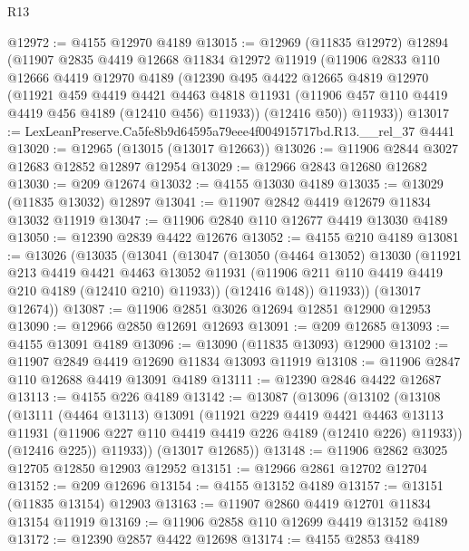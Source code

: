 \begin{lexlean}{R13}
\begin{coremodule}
@12972 := @4155 @12970 @4189
@13015 := @12969
    (@11835 @12972)
    @12894
    (@11907
      @2835
      @4419
      @12668
      @11834
      @12972
      @11919
      (@11906
        @2833
        @110
        @12666
        @4419
        @12970
        @4189
        (@12390
          @495
          @4422
          @12665
          @4819
          @12970
          (@11921
            @459
            @4419
            @4421
            @4463
            @4818
            @11931
            (@11906 @457 @110 @4419 @4419 @456 @4189 (@12410 @456) @11933))
          (@12416 @50))
        @11933))
@13017 := LexLeanPreserve.Ca5fe8b9d64595a79eee4f004915717bd.R13.__rel_37 @4441
@13020 := @12965 (@13015 (@13017 @12663))
@13026 := @11906 @2844 @3027 @12683 @12852 @12897 @12954
@13029 := @12966 @2843 @12680 @12682
@13030 := @209 @12674
@13032 := @4155 @13030 @4189
@13035 := @13029 (@11835 @13032) @12897
@13041 := @11907 @2842 @4419 @12679 @11834 @13032 @11919
@13047 := @11906 @2840 @110 @12677 @4419 @13030 @4189
@13050 := @12390 @2839 @4422 @12676
@13052 := @4155 @210 @4189
@13081 := @13026
    (@13035
      (@13041
        (@13047
          (@13050
            (@4464 @13052)
            @13030
            (@11921
              @213
              @4419
              @4421
              @4463
              @13052
              @11931
              (@11906 @211 @110 @4419 @4419 @210 @4189 (@12410 @210) @11933))
            (@12416 @148))
          @11933))
      (@13017 @12674))
@13087 := @11906 @2851 @3026 @12694 @12851 @12900 @12953
@13090 := @12966 @2850 @12691 @12693
@13091 := @209 @12685
@13093 := @4155 @13091 @4189
@13096 := @13090 (@11835 @13093) @12900
@13102 := @11907 @2849 @4419 @12690 @11834 @13093 @11919
@13108 := @11906 @2847 @110 @12688 @4419 @13091 @4189
@13111 := @12390 @2846 @4422 @12687
@13113 := @4155 @226 @4189
@13142 := @13087
    (@13096
      (@13102
        (@13108
          (@13111
            (@4464 @13113)
            @13091
            (@11921
              @229
              @4419
              @4421
              @4463
              @13113
              @11931
              (@11906 @227 @110 @4419 @4419 @226 @4189 (@12410 @226) @11933))
            (@12416 @225))
          @11933))
      (@13017 @12685))
@13148 := @11906 @2862 @3025 @12705 @12850 @12903 @12952
@13151 := @12966 @2861 @12702 @12704
@13152 := @209 @12696
@13154 := @4155 @13152 @4189
@13157 := @13151 (@11835 @13154) @12903
@13163 := @11907 @2860 @4419 @12701 @11834 @13154 @11919
@13169 := @11906 @2858 @110 @12699 @4419 @13152 @4189
@13172 := @12390 @2857 @4422 @12698
@13174 := @4155 @2853 @4189

\end{coremodule}
\end{lexlean}
